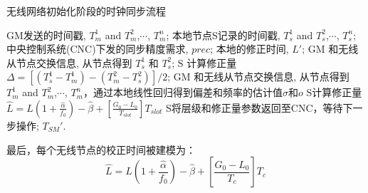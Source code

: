 \documentclass[UTF8,a4paper,12pt]{ctexart}
\numberwithin{equation}{section}
\begin{document}
\begin{figure}[H]
\end{figure}
\begin{algorithm}[ht]  
	\caption{无线网络初始化阶段的时钟同步流程}  
	\begin{algorithmic}[1]
		\REQUIRE GM发送的时间戳, $T_m^1$ and $T_m^2$,$\cdots$, $T_m^n$; 本地节点S记录的时间戳, $T_s^1$ and $T_s^2$,$\cdots$, $T_s^n$; 中央控制系统(CNC)下发的同步精度需求, $prec$;
		\ENSURE 本地的修正时间, $L'$;
		\STATE GM 和无线从节点交换信息, 从节点得到 $T_s^1$ 和 $T_s^2$; 
		\STATE S 计算修正量 $\Delta = [(T_s^1 - T_m^1) - (T_m^2 - T_s^2)]/2$;
		\ELSE  
		\STATE GM 和无线从节点交换信息, 从节点得到 $T_m^1$ and $T_m^2$,$\cdots$, $T_m^n$，通过本地线性回归得到偏差和频率的估计值$\sigma$和$o$	
		\STATE S计算修正量$\widehat{L}=L(1+\frac{\widehat{\alpha}}{f_0})-\widehat{\beta}+[\frac{G_0-L_0}{T_{slot}}]T_{slot}$			
		\ENDIF
		\STATE S将层级和修正量参数返回至CNC，等待下一步操作;
		\ENDWHILE
		\ENDWHILE
		\RETURN $T_{SM}'$.
	\end{algorithmic}
\end{algorithm}

最后，每个无线节点的校正时间被建模为：
\begin{equation}
	\widehat{L}=L\left(1+\frac{\widehat{\alpha}}{f_0}\right)-\widehat{\beta}+\left[\frac{G_0-L_0}{T_c}\right] T_c
\end{equation}
\end{document}
